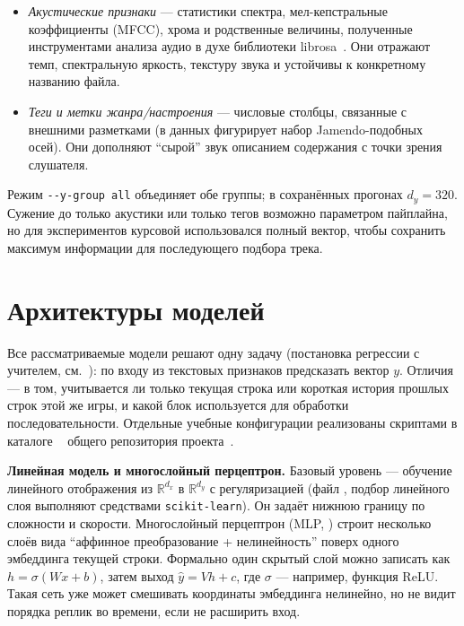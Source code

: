\begin{itemize}
	\item \textit{Акустические признаки} --- статистики спектра, мел-кепстральные коэффициенты (MFCC), хрома и родственные величины, полученные инструментами анализа аудио в духе библиотеки librosa~\cite{librosa}. Они отражают темп, спектральную яркость, текстуру звука и устойчивы к конкретному названию файла.
	\item \textit{Теги и метки жанра/настроения} --- числовые столбцы, связанные с внешними разметками (в данных фигурирует набор Jamendo-подобных осей). Они дополняют ``сырой'' звук описанием содержания с точки зрения слушателя.
\end{itemize}

Режим \texttt{-{}-y-group all} объединяет обе группы; в сохранённых прогонах $d_y = 320$. Сужение до только акустики или только тегов возможно параметром пайплайна, но для экспериментов курсовой использовался полный вектор, чтобы сохранить максимум информации для последующего подбора трека.

\section{Архитектуры моделей}

Все рассматриваемые модели решают одну задачу (постановка регрессии с учителем, см.~\cite{nikolenko2018}): по входу из текстовых признаков предсказать вектор $y$. Отличия --- в том, учитывается ли только текущая строка или короткая история прошлых строк этой же игры, и какой блок используется для обработки последовательности. Отдельные учебные конфигурации реализованы скриптами в каталоге ~ общего репозитория проекта~.

\textbf{Линейная модель и многослойный перцептрон.} Базовый уровень --- обучение линейного отображения из $\mathbb{R}^{d_x}$ в $\mathbb{R}^{d_y}$ с регуляризацией (файл , подбор линейного слоя выполняют средствами \texttt{scikit-learn}). Он задаёт нижнюю границу по сложности и скорости. Многослойный перцептрон (MLP, ) строит несколько слоёв вида ``аффинное преобразование + нелинейность'' поверх одного эмбеддинга текущей строки. Формально один скрытый слой можно записать как $h = \sigma(W x + b)$, затем выход $\hat y = V h + c$, где $\sigma$ --- например, функция ReLU. Такая сеть уже может смешивать координаты эмбеддинга нелинейно, но не видит порядка реплик во времени, если не расширить вход.

